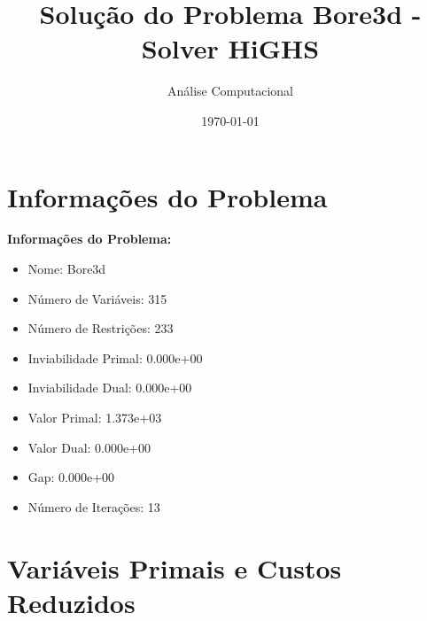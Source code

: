 \documentclass[12pt]{article}
\title{Solução do Problema Bore3d - Solver HiGHS}
\author{Análise Computacional}
\date{\today}
\begin{document}
\maketitle

\section{Informações do Problema}

\textbf{Informações do Problema:}
\begin{itemize}
\item Nome: Bore3d
\item Número de Variáveis: 315
\item Número de Restrições: 233
\item Inviabilidade Primal: 0.000e+00
\item Inviabilidade Dual: 0.000e+00
\item Valor Primal: 1.373e+03
\item Valor Dual: 0.000e+00
\item Gap: 0.000e+00
\item Número de Iterações: 13
\end{itemize}


\section{Variáveis Primais e Custos Reduzidos}
\end{document}
